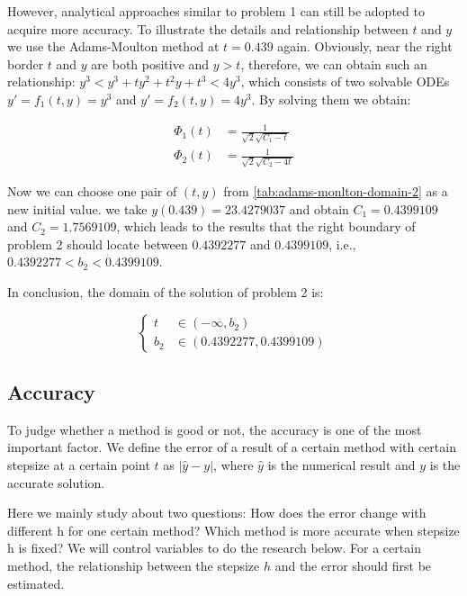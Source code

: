 \documentclass[a4paper]{article}
\begin{document}
	However, analytical approaches similar to problem 1 can still be adopted to acquire more accuracy. To illustrate the details and relationship between $t$ and $y$ we use the Adams-Moulton method at $t = 0.439$ again. Obviously, near the right border $t$ and $y$ are both positive and $y > t$, therefore, we can obtain such an relationship: $y^3 < y^3 + ty^2 +t^2y +t^3 < 4y^3$, which consists of two solvable ODEs $y' = f_1(t, y) = y^3$ and $y' = f_2(t, y) = 4y^3$. By solving them we obtain:
	
	\begin{align}
	    \Phi_1(t) &= \frac{1}{\sqrt{2}\sqrt{C_1 - t}} \\
	    \Phi_2(t) &= \frac{1}{\sqrt{2}\sqrt{C_2 - 4t}}
	\end{align}
	
	Now we can choose one pair of $(t, y)$ from \autoref{tab:adams-monlton-domain-2} as a new initial value. we take $y(0.439) = 23.4279037$ and obtain $C_1 = 0.4399109$ and $C_2 = 1.7569109$, which leads to the results that the right boundary of problem 2 should locate between $0.4392277$ and $0.4399109$, i.e., $0.4392277 < b_2 < 0.4399109$.
	
	In conclusion, the domain of the solution of problem 2 is:
	
	$$
	\left\{
    	\begin{aligned}
    	    t &\in (-\infty, b_2) \nonumber \\
    	    b_2 &\in (0.4392277, 0.4399109) \nonumber
    	\end{aligned}
	\right.
	$$


    
    \subsection{Accuracy}
    To judge whether a method is good or not, the accuracy is one of the most important factor. We define the error of a result of a certain method with certain stepsize at a certain point $t$ as $|\hat{y} - y|$, where $\hat{y}$ is the numerical result and $y$ is the accurate solution. 
    
    Here we mainly study about two questions: How does the error change with different h for one certain method? Which method is more accurate when stepsize h is fixed? We will control variables to do the research below. For a certain method, the relationship between the stepsize $h$ and the error should first be estimated.
    
\end{document}
